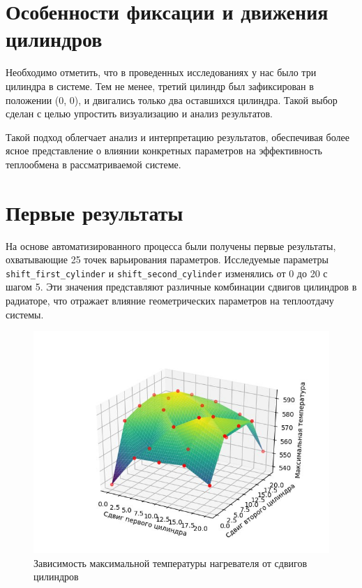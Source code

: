 \documentclass[a4paper,12pt]{article}
\theoremstyle{plain} %
\theoremstyle{definition} %
\theoremstyle{remark} %
\begin{document}
\section{Особенности фиксации и движения цилиндров}

Необходимо отметить, что в проведенных исследованиях у нас было три цилиндра в системе. Тем не менее, третий цилиндр был зафиксирован в положении (0, 0), и двигались только два оставшихся цилиндра. Такой выбор сделан с целью упростить визуализацию и анализ результатов.

Такой подход облегчает анализ и интерпретацию результатов, обеспечивая более ясное представление о влиянии конкретных параметров на эффективность теплообмена в рассматриваемой системе.

\section{Первые результаты}

На основе автоматизированного процесса были получены первые результаты, охватывающие 25 точек варьирования параметров. Исследуемые параметры \texttt{shift\_first\_cylinder} и \texttt{shift\_second\_cylinder} изменялись от 0 до 20 с шагом 5. Эти значения представляют различные комбинации сдвигов цилиндров в радиаторе, что отражает влияние геометрических параметров на теплоотдачу системы.

\begin{figure}[h]
	\begin{center}
		\includegraphics[width=0.4\linewidth]{16.1.jpg}
		\caption{Зависимость максимальной температуры нагревателя от сдвигов цилиндров} %
	\end{center}
\end{figure}
\end{document}
